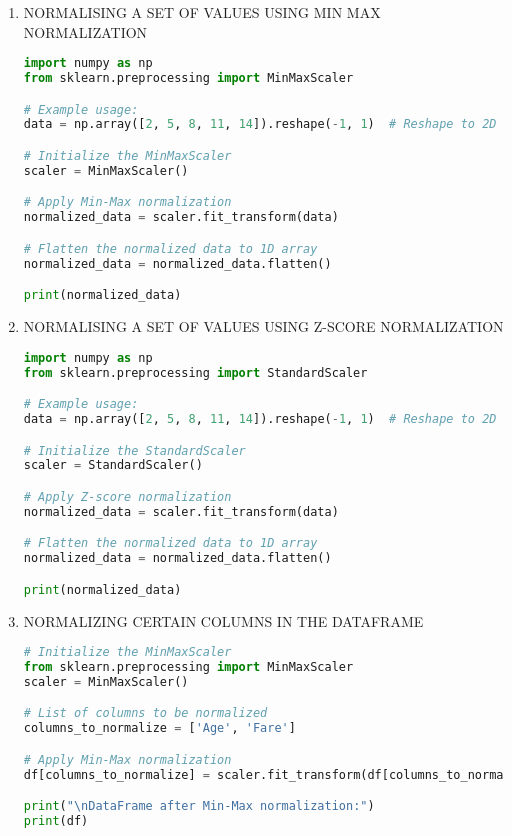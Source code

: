 \documentclass[11pt]{article}
\begin{document}
\begin{enumerate}
\item NORMALISING A SET OF VALUES USING MIN MAX NORMALIZATION
\label{sec:org3579567}
\begin{lstlisting}[language=Python,numbers=none]
import numpy as np
from sklearn.preprocessing import MinMaxScaler

# Example usage:
data = np.array([2, 5, 8, 11, 14]).reshape(-1, 1)  # Reshape to 2D array for scaler

# Initialize the MinMaxScaler
scaler = MinMaxScaler()

# Apply Min-Max normalization
normalized_data = scaler.fit_transform(data)

# Flatten the normalized data to 1D array
normalized_data = normalized_data.flatten()

print(normalized_data)
\end{lstlisting}
\item NORMALISING A SET OF VALUES USING Z-SCORE NORMALIZATION
\label{sec:orgfecec60}
\begin{lstlisting}[language=Python,numbers=none]
import numpy as np
from sklearn.preprocessing import StandardScaler

# Example usage:
data = np.array([2, 5, 8, 11, 14]).reshape(-1, 1)  # Reshape to 2D array for scaler

# Initialize the StandardScaler
scaler = StandardScaler()

# Apply Z-score normalization
normalized_data = scaler.fit_transform(data)

# Flatten the normalized data to 1D array
normalized_data = normalized_data.flatten()

print(normalized_data)
\end{lstlisting}
\item NORMALIZING CERTAIN COLUMNS IN THE DATAFRAME
\label{sec:orgcd1db96}
\begin{lstlisting}[language=Python,numbers=none]
# Initialize the MinMaxScaler
from sklearn.preprocessing import MinMaxScaler
scaler = MinMaxScaler()

# List of columns to be normalized
columns_to_normalize = ['Age', 'Fare']

# Apply Min-Max normalization
df[columns_to_normalize] = scaler.fit_transform(df[columns_to_normalize])

print("\nDataFrame after Min-Max normalization:")
print(df)
\end{lstlisting}
\end{enumerate}
\end{document}
